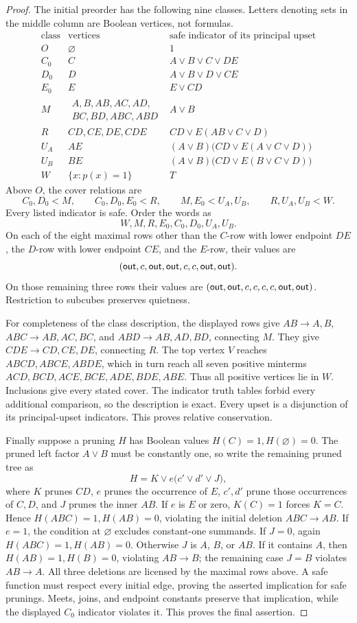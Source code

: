 \begin{proof}
The initial preorder has the following nine classes. Letters denoting
sets in the middle column are Boolean vertices, not formulas.
\[
\begin{array}{c|l|l}
 \text{class}&\text{vertices}&\text{safe indicator of its principal upset}\\\hline
 O&\varnothing&1\\
 C_0&C&A\vee B\vee C\vee DE\\
 D_0&D&A\vee B\vee D\vee CE\\
 E_0&E&E\vee CD\\
 M&\substack{A,B,AB,AC,AD,\\BC,BD,ABC,ABD}&A\vee B\\
 R&CD,CE,DE,CDE&CD\vee E(AB\vee C\vee D)\\
 U_A&AE&(A\vee B)\bigl(CD\vee E(A\vee C\vee D)\bigr)\\
 U_B&BE&(A\vee B)\bigl(CD\vee E(B\vee C\vee D)\bigr)\\
 W&\{x:p(x)=1\}&T
\end{array}
\]
Above $O$, the cover relations are
\[
 C_0,D_0<M,\qquad C_0,D_0,E_0<R,\qquad
 M,E_0<U_A,U_B,\qquad R,U_A,U_B<W.
\]
Every listed indicator is safe. Order the words as
\[
 W,M,R,E_0,C_0,D_0,U_A,U_B.
\]
On each of the eight maximal rows other than the $C$-row with lower
endpoint $DE$, the $D$-row with lower endpoint $CE$, and the $E$-row,
their values are
\[
 (\mathsf{out},c,\mathsf{out},\mathsf{out},c,c,\mathsf{out},\mathsf{out}).
\]
On those remaining three rows their values are
$(\mathsf{out},\mathsf{out},c,c,c,c,\mathsf{out},\mathsf{out})$.
Restriction to subcubes preserves quietness.

For completeness of the class description, the displayed rows give
$AB\to A,B$, $ABC\to AB,AC,BC$, and $ABD\to AB,AD,BD$,
connecting $M$. They give $CDE\to CD,CE,DE$, connecting $R$.
The top vertex $V$ reaches $ABCD,ABCE,ABDE$, which in turn reach all
seven positive minterms
$ACD,BCD,ACE,BCE,ADE,BDE,ABE$.
Thus all positive vertices lie in $W$. Inclusions give every stated
cover. The indicator truth tables forbid every additional comparison,
so the description is exact. Every upset is a disjunction of its
principal-upset indicators. This proves relative conservation.

Finally suppose a pruning $H$ has Boolean values $H(C)=1,H(\varnothing)=0$.
The pruned left factor $A\vee B$ must be constantly one, so write the
remaining pruned tree as
\[
 H=K\vee e\bigl(c'\vee d'\vee J\bigr),
\]
where $K$ prunes $CD$, $e$ prunes the occurrence of $E$, $c',d'$ prune
those occurrences of $C,D$, and $J$ prunes the inner $AB$.
If $e$ is $E$ or zero, $K(C)=1$ forces $K=C$. Hence
$H(ABC)=1,H(AB)=0$, violating the initial deletion $ABC\to AB$.
If $e=1$, the condition at $\varnothing$ excludes constant-one
summands. If $J=0$, again $H(ABC)=1,H(AB)=0$.
Otherwise $J$ is $A$, $B$, or $AB$. If it contains $A$, then
$H(AB)=1,H(B)=0$, violating $AB\to B$; the remaining case $J=B$
violates $AB\to A$.
All three deletions are licensed by the maximal rows above.
A safe function must respect every initial edge, proving the asserted
implication for safe prunings. Meets, joins, and endpoint constants
preserve that implication, while the displayed $C_0$ indicator violates
it. This proves the final assertion.
\end{proof}

